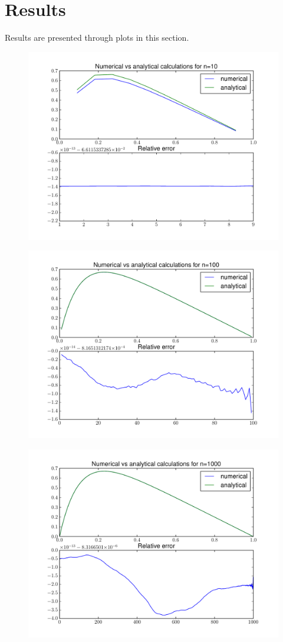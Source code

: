 \documentclass[10pt,a4paper]{article}
\begin{document}
    \section{Results}
    Results are presented through plots in this section.
    \begin{figure}[b]
      \includegraphics[width = \textwidth]{general_10}
    \end{figure}
    \begin{figure}
      \includegraphics[width = \textwidth]{general_100}
    \end{figure}
    \begin{figure}
      \includegraphics[width = \textwidth]{general_1000}
    \end{figure}
\end{document}
